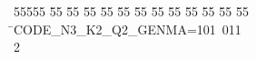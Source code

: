 %
%
\begin{tabbing}
55555 \= 55 \= 55 \= 55 \= 55 \= 55 \= 55 \= 55 \= 55 \= 55 \= 55 \= 55 \= 55 \= \>CODE\_N3\_K2\_Q2\_GENMA=101\ 011\\[0pt]
2\>\end{tabbing}
